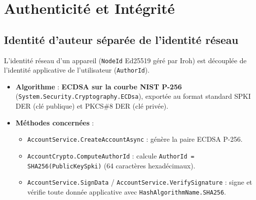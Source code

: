 \documentclass[11pt,a4paper]{article}
\begin{document}
\section{Authenticité et Intégrité}

\subsection{Identité d'auteur séparée de l'identité réseau}
L'identité réseau d'un appareil (\texttt{NodeId} Ed25519 géré par Iroh) est découplée de l'identité applicative de l'utilisateur (\texttt{AuthorId}).
\begin{itemize}
    \item \textbf{Algorithme} : \textbf{ECDSA sur la courbe NIST P-256} (\texttt{System.Security.Cryptography.ECDsa}), exportée au format standard SPKI DER (clé publique) et PKCS\#8 DER (clé privée).
    \item \textbf{Méthodes concernées} :
    \begin{itemize}
        \item \texttt{AccountService.CreateAccountAsync} : génère la paire ECDSA P-256.
        \item \texttt{AccountCrypto.ComputeAuthorId} : calcule \texttt{AuthorId = SHA256(PublicKeySpki)} (64 caractères hexadécimaux).
        \item \texttt{AccountService.SignData} / \texttt{AccountService.VerifySignature} : signe et vérifie toute donnée applicative avec \texttt{HashAlgorithmName.SHA256}.
    \end{itemize}
\end{itemize}
\end{document}

